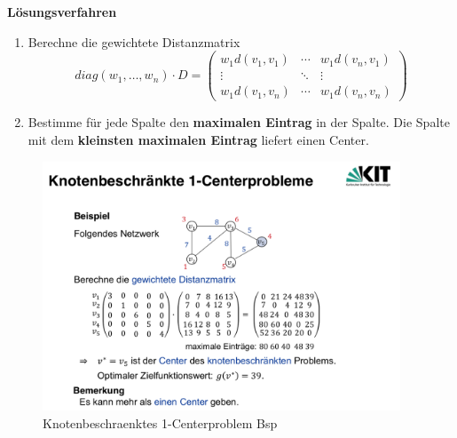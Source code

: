       \par \textbf{Lösungsverfahren}
      \begin{enumerate}
        \item Berechne die gewichtete Distanzmatrix
              $$
                diag(w_1, \dots, w_n) \cdot D = 
                \begin{pmatrix}
                  w_1d(v_1, v_1) &  \cdots & w_1d(v_n, v_1) \\
                  \vdots  & \ddots & \vdots  \\
                  w_1d(v_1, v_n) & \cdots & w_1d(v_n, v_n)
               \end{pmatrix}
              $$
              
        \item Bestimme für jede Spalte den \textbf{maximalen Eintrag} in der Spalte. Die Spalte mit dem \textbf{kleinsten maximalen Eintrag} liefert einen Center.
      \end{enumerate}

      \begin{exmp}
        
      \end{exmp}

      \begin{figure}[H]
        \centering
        \includegraphics[width=0.95\textwidth]{Images/Knotenbeschraenktes_1_Centerproblem_Bsp.png}
        \caption{Knotenbeschraenktes 1-Centerproblem Bsp}
        \label{fig:Knotenbeschraenktes_1_Centerproblem_Bsp}
      \end{figure}


